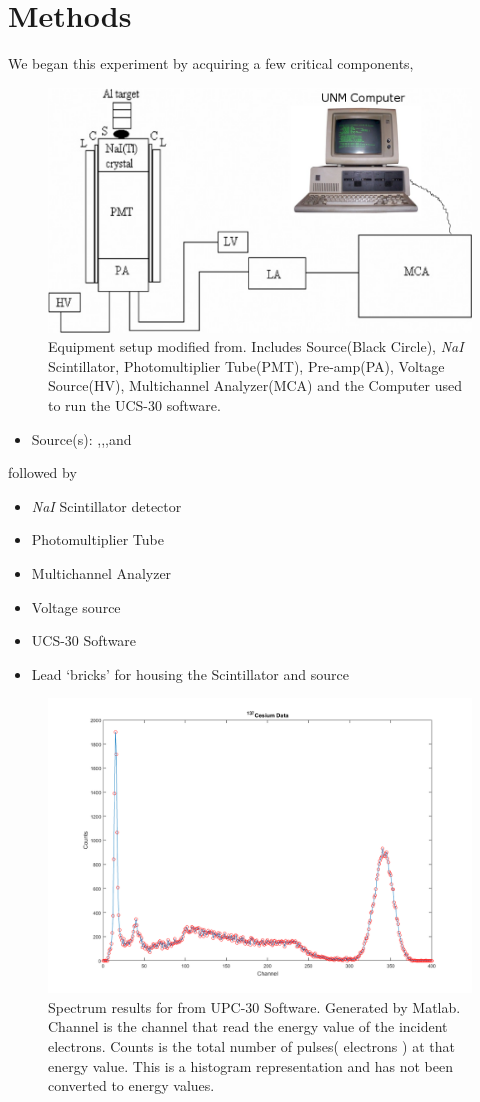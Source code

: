 \documentclass[%
 reprint,
 amsmath,amssymb,
 aps,
]{revtex4-1}
\begin{document}
\section{\label{sec:level1}Methods}
We began this experiment by acquiring a few critical components,
\begin{figure}[ht]
\includegraphics[width = .5\textwidth ]{setup.png}
\caption{ Equipment setup modified from\cite{SBH}. Includes Source(Black Circle), \textit{NaI} Scintillator, Photomultiplier Tube(PMT), Pre-amp(PA), Voltage Source(HV), Multichannel Analyzer(MCA) and the Computer used to run the UCS-30 software.}
\end{figure}
\begin{itemize}
\item Source(s): \cs,\ba,\na,and \co
\end{itemize}
followed by
\begin{itemize}
\item \textit{NaI} Scintillator detector
\item Photomultiplier Tube 
\item Multichannel Analyzer 
\item Voltage source
\item UCS-30 Software
\item Lead `bricks' for housing the Scintillator and source
\end{itemize}

\begin{figure}[ht]
\includegraphics[width =\textwidth ,keepaspectratio,frame]{cs.png}
\caption{Spectrum results for \cs from UPC-30 Software. Generated by Matlab. Channel is the channel that read the energy value of the incident electrons. Counts is the total number of pulses( electrons ) at that energy value. This is a histogram representation and has not been converted to energy values.}
\end{figure}
\end{document}
